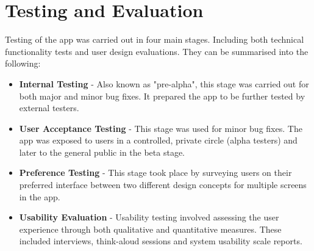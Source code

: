 \chapter{Testing and Evaluation}
Testing of the app was carried out in four main stages. Including both technical functionality tests and user design evaluations. They can be summarised into the following:
\begin{itemize}
    \item \textbf{Internal Testing} - Also known as "pre-alpha", this stage was carried out for both major and minor bug fixes. It prepared the app to be further tested by external testers.
    \item \textbf{User Acceptance Testing} - This stage was used for minor bug fixes. The app was exposed to users in a controlled, private circle (alpha testers) and later to the general public in the beta stage.
    \item \textbf{Preference Testing} - This stage took place by surveying users on their preferred interface between two different design concepts for multiple screens in the app.
    \item \textbf{Usability Evaluation} - Usability testing involved assessing the user experience through both qualitative and quantitative measures. These included interviews, think-aloud sessions and system usability scale reports.
\end{itemize}

